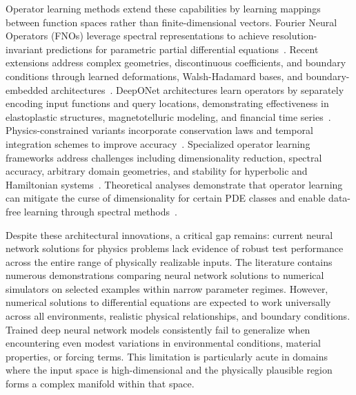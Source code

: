 Operator learning methods extend these capabilities by learning mappings between function spaces rather than finite-dimensional vectors. Fourier Neural Operators (FNOs) leverage spectral representations to achieve resolution-invariant predictions for parametric partial differential equations~\cite{Li2020Fourier,Li2022Fourier,Wen2021UFNO}. Recent extensions address complex geometries, discontinuous coefficients, and boundary conditions through learned deformations, Walsh-Hadamard bases, and boundary-embedded architectures~\cite{Raoni'c2023Convolut,Cavallazzi2025WalshHad,Wang2024BENO}. DeepONet architectures learn operators by separately encoding input functions and query locations, demonstrating effectiveness in elastoplastic structures, magnetotelluric modeling, and financial time series~\cite{He2023Novel,Liao2024Fast,Ahmad2024DeepONet}. Physics-constrained variants incorporate conservation laws and temporal integration schemes to improve accuracy~\cite{Jnini2025Physicsc,Mandl2025PhysicsI}. Specialized operator learning frameworks address challenges including dimensionality reduction, spectral accuracy, arbitrary domain geometries, and stability for hyperbolic and Hamiltonian systems~\cite{Mandl2024Separabl,Sojitra2025FEDONet,Mousavi2025RIGNO,Xiao2024Neural,Tanaka2024Neural}. Theoretical analyses demonstrate that operator learning can mitigate the curse of dimensionality for certain PDE classes and enable data-free learning through spectral methods~\cite{Chen2023Deep,Choi2023Spectral,Rahman2024Pretrain,Zhang2025PhysicsI}.

Despite these architectural innovations, a critical gap remains: current neural network solutions for physics problems lack evidence of robust test performance across the entire range of physically realizable inputs. The literature contains numerous demonstrations comparing neural network solutions to numerical simulators on selected examples within narrow parameter regimes. However, numerical solutions to differential equations are expected to work universally across all environments, realistic physical relationships, and boundary conditions. Trained deep neural network models consistently fail to generalize when encountering even modest variations in environmental conditions, material properties, or forcing terms. This limitation is particularly acute in domains where the input space is high-dimensional and the physically plausible region forms a complex manifold within that space.

